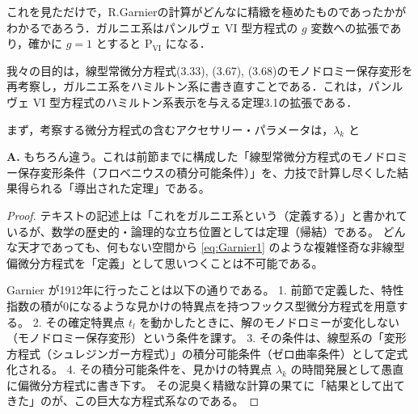 \begin{story}
これを見ただけで，R.Garnierの計算がどんなに精緻を極めたものであったかがわかるであろう．ガルニエ系はパンルヴェ $\mathrm{VI}$ 型方程式の $g$ 変数への拡張であり，確かに $g=1$ とすると $\mathrm{P_{VI}}$ になる．

我々の目的は，線型常微分方程式(3.33), (3.67), (3.68)のモノドロミー保存変形を再考察し，ガルニエ系をハミルトン系に書き直すことである．これは，パンルヴェ $\mathrm{VI}$ 型方程式のハミルトン系表示を与える定理3.1の拡張である．

まず，考察する微分方程式の含むアクセサリー・パラメータは，$\lambda_k$ と
\end{story}

\begin{Q}
\textbf{A.} もちろん違う。これは前節までに構成した「線型常微分方程式のモノドロミー保存変形条件（フロベニウスの積分可能条件）」を、力技で計算し尽くした結果得られる「導出された定理」である。

\begin{proof}
テキストの記述上は「これをガルニエ系という（定義する）」と書かれているが、数学の歴史的・論理的な立ち位置としては定理（帰結）である。
どんな天才であっても、何もない空間から \eqref{eq:Garnier1} のような複雑怪奇な非線型偏微分方程式を「定義」として思いつくことは不可能である。

Garnier が1912年に行ったことは以下の通りである。
1. 前節で定義した、特性指数の積が0になるような見かけの特異点を持つフックス型微分方程式を用意する。
2. その確定特異点 $t_l$ を動かしたときに、解のモノドロミーが変化しない（モノドロミー保存変形）という条件を課す。
3. その条件は、線型系の「変形方程式（シュレジンガー方程式）」の積分可能条件（ゼロ曲率条件）として定式化される。
4. その積分可能条件を、見かけの特異点 $\lambda_k$ の時間発展として愚直に偏微分方程式に書き下す。
その泥臭く精緻な計算の果てに「結果として出てきた」のが、この巨大な方程式系なのである。
\end{proof}
\end{Q}


